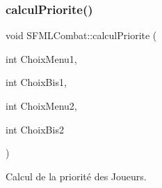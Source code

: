 \subsubsection{\texorpdfstring{calcul\+Priorite()}{calculPriorite()}}
{\footnotesize\ttfamily void S\+F\+M\+L\+Combat\+::calcul\+Priorite (\begin{DoxyParamCaption}\item[{int}]{Choix\+Menu1,  }\item[{int}]{Choix\+Bis1,  }\item[{int}]{Choix\+Menu2,  }\item[{int}]{Choix\+Bis2 }\end{DoxyParamCaption})\hspace{0.3cm}{\ttfamily [private]}}



Calcul de la priorité des Joueurs. 

